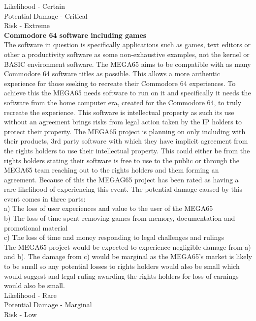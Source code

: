 Likelihood - Certain \\
Potential Damage - Critical \\
Risk - Extreme \\


\textbf{Commodore 64 software including games}\\
The software in question is specifically applications such as games, text editors or other a productivity software as some non-exhaustive examples, not the kernel or BASIC environment software. The MEGA65 aims to be compatible with as many Commodore 64 software titles as possible. This allows a more authentic experience for those seeking to recreate their Commodore 64 experiences. To achieve this the MEGA65 needs software to run on it and specifically it needs the software from the home computer era, created for the Commodore 64, to truly recreate the experience. This software is intellectual property as such its use without an agreement brings risks from legal action taken by the IP holders to protect their property. The MEGA65 project is planning on only including with their products, 3rd party software with which they have implicit agreement from the rights holders to use their intellectual property. This could either be from the rights holders stating their software is free to use to the public or through the MEGA65 team reaching out to the rights holders and them forming an agreement. Because of this the MEGAG65 project has been rated as having a rare likelihood of experiencing this event. The potential damage caused by this event comes in three parts: \\
a) The loss of user experiences and value to the user of the MEGA65 \\
b) The loss of time spent removing games from memory, documentation and promotional material \\
c) The loss of time and money responding to legal challenges and rulings \\
The MEGA65 project would be expected to experience negligible damage from a) and b). The damage from c) would be marginal as the MEGA65's market is likely to be small so any potential losses to rights holders would also be small which would suggest and legal ruling awarding the rights holders for loss of earnings would also be small. \\

Likelihood - Rare \\
Potential Damage - Marginal \\
Risk - Low \\


